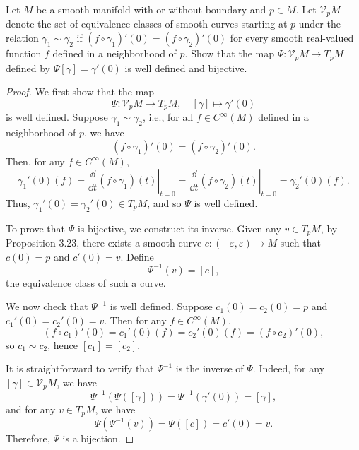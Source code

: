 \begin{problem}
    Let $M$ be a smooth manifold with or without boundary and $p \in M$. Let $\mathcal{V}_pM$ denote the set of equivalence classes of smooth curves starting at $p$ under the relation $\gamma_1 \sim \gamma_2$ if $(f \circ \gamma_1)'(0) = (f \circ \gamma_2)'(0)$ for every smooth real-valued function $f$ defined in a neighborhood of $p$. Show that the map $\Psi \colon \mathcal{V}_pM \to T_pM$ defined by $\Psi[\gamma] = \gamma'(0)$ is well defined and bijective.
    \begin{proof}
        We first show that the map
        \[
        \Psi \colon \mathcal{V}_pM \to T_pM, \quad [\gamma] \mapsto \gamma'(0)
        \]
        is well defined. Suppose \( \gamma_1 \sim \gamma_2 \), i.e., for all \( f \in C^\infty(M) \) defined in a neighborhood of \( p \), we have
        \[
        (f \circ \gamma_1)'(0) = (f \circ \gamma_2)'(0).
        \]
        Then, for any \( f \in C^\infty(M) \),
        \[
        \gamma_1'(0)(f) = \left.\frac{\dd}{\dd{t}} (f \circ \gamma_1)(t) \right|_{t=0}
        = \left.\frac{\dd}{\dd{t}} (f \circ \gamma_2)(t) \right|_{t=0}
        = \gamma_2'(0)(f).
        \]
        Thus, \( \gamma_1'(0) = \gamma_2'(0) \in T_pM \), and so \( \Psi \) is well defined.

        To prove that \( \Psi \) is bijective, we construct its inverse. Given any \( v \in T_pM \), by Proposition 3.23, there exists a smooth curve \( c \colon (-\varepsilon, \varepsilon) \to M \) such that \( c(0) = p \) and \( c'(0) = v \). Define
        \[
        \Psi^{-1}(v) = [c],
        \]
        the equivalence class of such a curve.

        We now check that \( \Psi^{-1} \) is well defined. Suppose \( c_1(0) = c_2(0) = p \) and \( c_1'(0) = c_2'(0) = v \). Then for any \( f \in C^\infty(M) \),
        \[
        (f \circ c_1)'(0) = c_1'(0)(f) = c_2'(0)(f) = (f \circ c_2)'(0),
        \]
        so \( c_1 \sim c_2 \), hence \( [c_1] = [c_2] \).

        It is straightforward to verify that \( \Psi^{-1} \) is the inverse of \( \Psi \). Indeed, for any \( [\gamma] \in \mathcal{V}_pM \), we have
        \[
        \Psi^{-1}(\Psi([\gamma])) = \Psi^{-1}(\gamma'(0)) = [\gamma],
        \]
        and for any \( v \in T_pM \), we have
        \[
        \Psi(\Psi^{-1}(v)) = \Psi([c]) = c'(0) = v.
        \]
        Therefore, \( \Psi \) is a bijection.
    \end{proof}
\end{problem}
